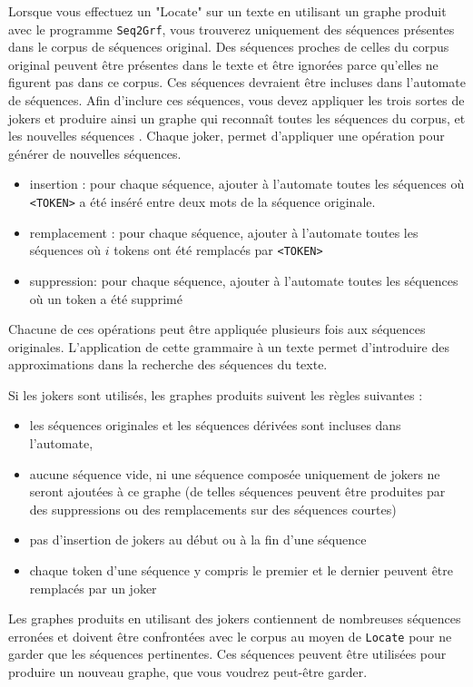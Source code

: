 Lorsque vous effectuez un "Locate" sur un texte en utilisant un graphe produit avec le programme
\verb+Seq2Grf+, vous trouverez uniquement des séquences présentes dans le corpus de séquences
original. Des séquences proches de celles du corpus original peuvent être présentes dans le texte et
être ignorées parce qu'elles ne figurent pas dans ce corpus. Ces séquences devraient être incluses
dans l'automate de séquences. Afin d'inclure ces séquences, vous devez appliquer les trois sortes de
jokers et produire ainsi un graphe qui reconnaît toutes les  séquences du corpus, et les nouvelles séquences 
. Chaque joker, permet d'appliquer une opération pour générer de nouvelles séquences.
\begin{itemize}
	\item insertion : pour chaque séquence, ajouter à l'automate toutes les séquences où
	\verb+<TOKEN>+ a été inséré entre deux mots de la séquence originale.
	\item remplacement : pour chaque séquence, ajouter à l'automate toutes les séquences où $i$
		tokens ont été remplacés par \verb+<TOKEN>+
	\item suppression: pour chaque séquence, ajouter à l'automate toutes les séquences où un
		token a été supprimé
\end{itemize}
Chacune de ces opérations peut être appliquée plusieurs fois aux séquences originales. L'application
de cette grammaire à un texte permet d'introduire des approximations dans la recherche des séquences
du texte.

Si les jokers sont utilisés, les graphes produits suivent les règles suivantes :
\begin{itemize}
	\item les séquences originales et les séquences dérivées sont incluses dans l'automate,
	\item aucune séquence vide, ni une séquence composée uniquement de jokers ne seront ajoutées
		à ce graphe (de telles séquences peuvent être produites par des suppressions ou des
			remplacements sur des séquences courtes)
	\item pas d'insertion de jokers au début ou à la fin d'une séquence
	\item chaque token d'une séquence y compris le premier et le dernier peuvent être remplacés
		par un joker
\end{itemize}
Les graphes produits en utilisant des jokers contiennent de nombreuses séquences erronées et doivent
être confrontées avec le corpus au moyen de \verb+Locate+ pour ne garder que les séquences
pertinentes. Ces séquences peuvent être utilisées pour produire un nouveau graphe, que vous voudrez
peut-être garder.
\bigskip

